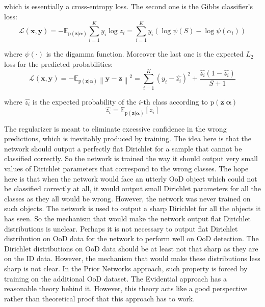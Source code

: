 \documentclass{article}
\newcommand{\norm}[1]{\left\lVert#1\right\rVert}
\begin{document}
which is essentially a cross-entropy loss.
The second one is the Gibbs classifier's loss:
\begin{equation}
\mathcal{L}(\boldsymbol{x}, \boldsymbol{y}) = -\mathbb{E}_{\mathrm{p}(\boldsymbol{z} | \boldsymbol{\alpha})} \sum_{i=1}^K y_i \log z_i = \sum_{i=1}^K y_i (\log\psi(S) - \log\psi(\alpha_i))
\end{equation}

where $\psi(\cdot)$ is the digamma function.
Moreover the last one is the expected $L_2$ loss for the predicted probabilities:
\begin{equation}
\mathcal{L}(\boldsymbol{x}, \boldsymbol{y}) = -\mathbb{E}_{\mathrm{p}(\boldsymbol{z} | \boldsymbol{\alpha})} \norm{\boldsymbol{y} - \boldsymbol{z}}^2 = \sum_{i=1}^K (y_i - \hat{z_i})^2 + \frac{\hat{z_i}(1 - \hat{z_i})}{S + 1}
\end{equation}

where $\hat{z_i}$ is the expected probability of the $i$-th class according to $\mathrm{p}(\boldsymbol{z} | \boldsymbol{\alpha})$
\begin{equation}
\hat{z_i} = \mathbb{E}_{\mathrm{p}(\boldsymbol{z} | \boldsymbol{\alpha})}[z_i]
\end{equation}

The regularizer is meant to eliminate excessive confidence in the wrong predictions, which is inevitably produced by training.
The idea here is that the network should output a perfectly flat Dirichlet for a sample that cannot be classified correctly.
So the network is trained the way it should output very small values of Dirichlet parameters that correspond to the wrong classes.
The hope here is that when the network would face an utterly OoD object which could not be classified correctly at all, it would output small Dirichlet parameters for all the classes as they all would be wrong.
However, the network was never trained on such objects.
The network is used to output a sharp Dirichlet for all the objects it has seen.
So the mechanism that would make the network output flat Dirichlet distributions is unclear.
Perhaps it is not necessary to output flat Dirichlet distribution on OoD data for the network to perform well on OoD detection.
The Dirichlet distributions on OoD data should be at least not that sharp as they are on the ID data.
However, the mechanism that would make these distributions less sharp is not clear.
In the Prior Networks approach, such property is forced by training on the additional OoD dataset.
The Evidential approach has a reasonable theory behind it. However, this theory acts like a good perspective rather than theoretical proof that this approach has to work.
\end{document}
